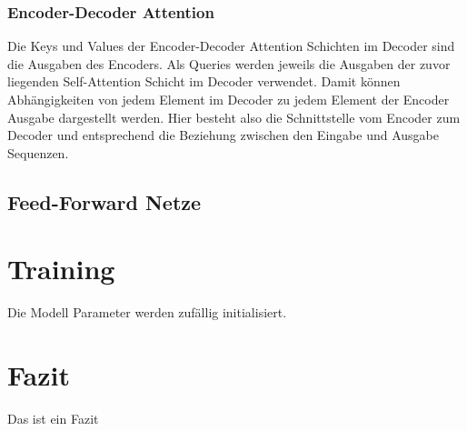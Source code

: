 \documentclass[conference]{IEEEtran}
\begin{document}
\subsubsection{Encoder-Decoder Attention}
Die Keys und Values der Encoder-Decoder Attention Schichten im Decoder sind die Ausgaben des Encoders. Als Queries werden jeweils die Ausgaben der zuvor liegenden Self-Attention Schicht im Decoder verwendet. Damit können Abhängigkeiten von jedem Element im Decoder zu jedem Element der Encoder Ausgabe dargestellt werden. Hier besteht also die Schnittstelle vom Encoder zum Decoder und entsprechend die Beziehung zwischen den Eingabe und Ausgabe Sequenzen.

\subsection{Feed-Forward Netze}


\section{Training}
Die Modell Parameter werden zufällig initialisiert.


\section{Fazit}
Das ist ein Fazit



\printbibliography
\end{document}
